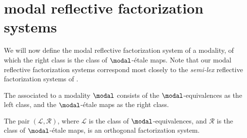 \documentclass{msc}
\begin{document}
  \section{modal reflective factorization systems}\label{section:reflective-factorization-system}

  We will now define the modal reflective factorization system of a modality, of which the right class is the class of $\modal$-\'etale maps.
  Note that our modal reflective factorization systems correspond most closely to the \emph{semi-lex} reflective factorization systems of \cite{cassidy_hebert_kelly_1985}.

\begin{defn}\label{defn:modalrfs}
The  associated to a modality $\modal$ consists of the $\modal$-equivalences as the left class, and the $\modal$-\'etale maps as the right class.
\end{defn}

\begin{thm}\label{thm:rfs_orthogonal}
  The pair $(\mathcal{L},\mathcal{R})$, where $\mathcal{L}$ is the class of $\modal$-equivalences, and $\mathcal{R}$ is the class of $\modal$-\'etale maps, is an orthogonal factorization system.
\end{thm}
\end{document}
